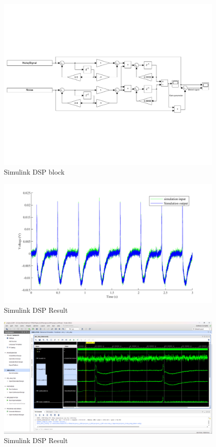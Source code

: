 \begin{figure}[!ht]
\centering
\includegraphics[width=1\linewidth]{4-ANC_Sys/Simulink.pdf}
\caption{Simulink DSP block}
\label{fig_Simulink}
\end{figure}

\begin{figure}[!ht]
\centering
\includegraphics[width=1\linewidth]{4-ANC_Sys/SimulinkResult.pdf}
\caption{Simulink DSP Result}
\label{fig_SimulinkResult}
\end{figure}

\begin{figure}[!ht]
\centering
\includegraphics[width=1\linewidth]{4-ANC_Sys/VivadoSim.png}
\caption{Simulink DSP Result}
\label{fig_SimulinkResult}
\end{figure}



